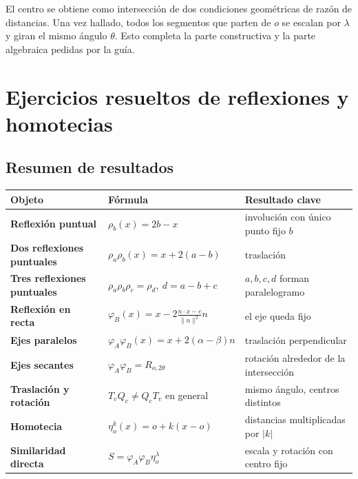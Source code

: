 \begin{resultado}
El centro se obtiene como intersección de dos condiciones geométricas de razón de distancias.
Una vez hallado, todos los segmentos que parten de \(o\) se escalan por \(\lambda\) y giran
el mismo ángulo \(\theta\). Esto completa la parte constructiva y la parte algebraica pedidas
por la guía.
\end{resultado}

\section{Ejercicios resueltos de reflexiones y homotecias}

\subsection{Resumen de resultados}

\begin{center}
\begin{tabularx}{\textwidth}{>{\bfseries}p{31mm} X X}
\toprule
Objeto & Fórmula & Resultado clave\\
\midrule
Reflexión puntual &
\(\rho_b(x)=2b-x\) &
involución con único punto fijo \(b\)\\
Dos reflexiones puntuales &
\(\rho_a\rho_b(x)=x+2(a-b)\) &
traslación\\
Tres reflexiones puntuales &
\(\rho_a\rho_b\rho_c=\rho_d,\ d=a-b+c\) &
\(a,b,c,d\) forman paralelogramo\\
Reflexión en recta &
\(\varphi_B(x)=x-2\frac{n\cdot x-c}{\|n\|^2}n\) &
el eje queda fijo\\
Ejes paralelos &
\(\varphi_A\varphi_B(x)=x+2(\alpha-\beta)n\) &
traslación perpendicular\\
Ejes secantes &
\(\varphi_A\varphi_B=R_{o,2\theta}\) &
rotación alrededor de la intersección\\
Traslación y rotación &
\(T_vQ_c\neq Q_cT_v\) en general &
mismo ángulo, centros distintos\\
Homotecia &
\(\eta_o^k(x)=o+k(x-o)\) &
distancias multiplicadas por \(|k|\)\\
Similaridad directa &
\(S=\varphi_A\varphi_B\eta_o^\lambda\) &
escala y rotación con centro fijo\\
\bottomrule
\end{tabularx}
\end{center}

